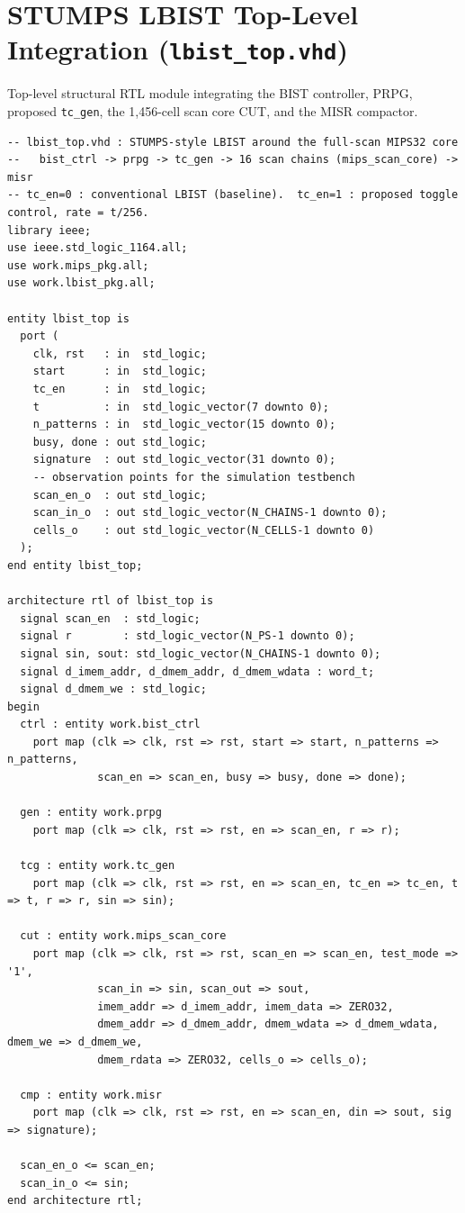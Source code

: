\documentclass[conference]{IEEEtran}
\begin{document}
\section{STUMPS LBIST Top-Level Integration (\texttt{lbist\_top.vhd})}
\label{app:lbist_top}
Top-level structural RTL module integrating the BIST controller, PRPG, proposed \texttt{tc\_gen}, the 1,456-cell scan core CUT, and the MISR compactor.

\begin{lstlisting}[style=vhdlstyle, caption={STUMPS LBIST Top-Level Module (\texttt{lbist\_top.vhd})}]
-- lbist_top.vhd : STUMPS-style LBIST around the full-scan MIPS32 core
--   bist_ctrl -> prpg -> tc_gen -> 16 scan chains (mips_scan_core) -> misr
-- tc_en=0 : conventional LBIST (baseline).  tc_en=1 : proposed toggle control, rate = t/256.
library ieee;
use ieee.std_logic_1164.all;
use work.mips_pkg.all;
use work.lbist_pkg.all;

entity lbist_top is
  port (
    clk, rst   : in  std_logic;
    start      : in  std_logic;
    tc_en      : in  std_logic;
    t          : in  std_logic_vector(7 downto 0);
    n_patterns : in  std_logic_vector(15 downto 0);
    busy, done : out std_logic;
    signature  : out std_logic_vector(31 downto 0);
    -- observation points for the simulation testbench
    scan_en_o  : out std_logic;
    scan_in_o  : out std_logic_vector(N_CHAINS-1 downto 0);
    cells_o    : out std_logic_vector(N_CELLS-1 downto 0)
  );
end entity lbist_top;

architecture rtl of lbist_top is
  signal scan_en  : std_logic;
  signal r        : std_logic_vector(N_PS-1 downto 0);
  signal sin, sout: std_logic_vector(N_CHAINS-1 downto 0);
  signal d_imem_addr, d_dmem_addr, d_dmem_wdata : word_t;
  signal d_dmem_we : std_logic;
begin
  ctrl : entity work.bist_ctrl
    port map (clk => clk, rst => rst, start => start, n_patterns => n_patterns,
              scan_en => scan_en, busy => busy, done => done);

  gen : entity work.prpg
    port map (clk => clk, rst => rst, en => scan_en, r => r);

  tcg : entity work.tc_gen
    port map (clk => clk, rst => rst, en => scan_en, tc_en => tc_en, t => t, r => r, sin => sin);

  cut : entity work.mips_scan_core
    port map (clk => clk, rst => rst, scan_en => scan_en, test_mode => '1',
              scan_in => sin, scan_out => sout,
              imem_addr => d_imem_addr, imem_data => ZERO32,
              dmem_addr => d_dmem_addr, dmem_wdata => d_dmem_wdata, dmem_we => d_dmem_we,
              dmem_rdata => ZERO32, cells_o => cells_o);

  cmp : entity work.misr
    port map (clk => clk, rst => rst, en => scan_en, din => sout, sig => signature);

  scan_en_o <= scan_en;
  scan_in_o <= sin;
end architecture rtl;
\end{lstlisting}
\end{document}
